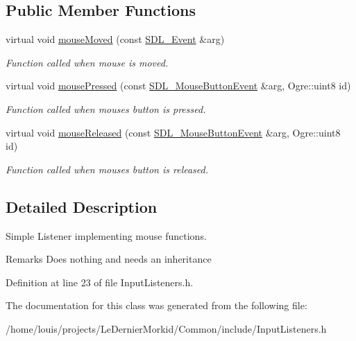 \subsection*{Public Member Functions}
\begin{DoxyCompactItemize}
\item 
\mbox{\label{class_common_1_1_mouse_listener_a5c61cd1a790d55852a647235371fa5ee}} 
virtual void \hyperlink{class_common_1_1_mouse_listener_a5c61cd1a790d55852a647235371fa5ee}{mouse\+Moved} (const \hyperlink{union_s_d_l___event}{S\+D\+L\+\_\+\+Event} \&arg)
\begin{DoxyCompactList}\small\item\em Function called when mouse is moved. \end{DoxyCompactList}\item 
\mbox{\label{class_common_1_1_mouse_listener_a5b62c0b51cdb3a99ea099c72fb2fa767}} 
virtual void \hyperlink{class_common_1_1_mouse_listener_a5b62c0b51cdb3a99ea099c72fb2fa767}{mouse\+Pressed} (const \hyperlink{struct_s_d_l___mouse_button_event}{S\+D\+L\+\_\+\+Mouse\+Button\+Event} \&arg, Ogre\+::uint8 id)
\begin{DoxyCompactList}\small\item\em Function called when mouse\textquotesingle{}s button is pressed. \end{DoxyCompactList}\item 
\mbox{\label{class_common_1_1_mouse_listener_a820334fbe8a5094938512ebe13965fdc}} 
virtual void \hyperlink{class_common_1_1_mouse_listener_a820334fbe8a5094938512ebe13965fdc}{mouse\+Released} (const \hyperlink{struct_s_d_l___mouse_button_event}{S\+D\+L\+\_\+\+Mouse\+Button\+Event} \&arg, Ogre\+::uint8 id)
\begin{DoxyCompactList}\small\item\em Function called when mouse\textquotesingle{}s button is released. \end{DoxyCompactList}\end{DoxyCompactItemize}


\subsection{Detailed Description}
Simple Listener implementing mouse functions. 

\begin{DoxyRemark}{Remarks}
Does nothing and needs an inheritance 
\end{DoxyRemark}


Definition at line 23 of file Input\+Listeners.\+h.



The documentation for this class was generated from the following file\+:\begin{DoxyCompactItemize}
\item 
/home/louis/projects/\+Le\+Dernier\+Morkid/\+Common/include/Input\+Listeners.\+h\end{DoxyCompactItemize}

